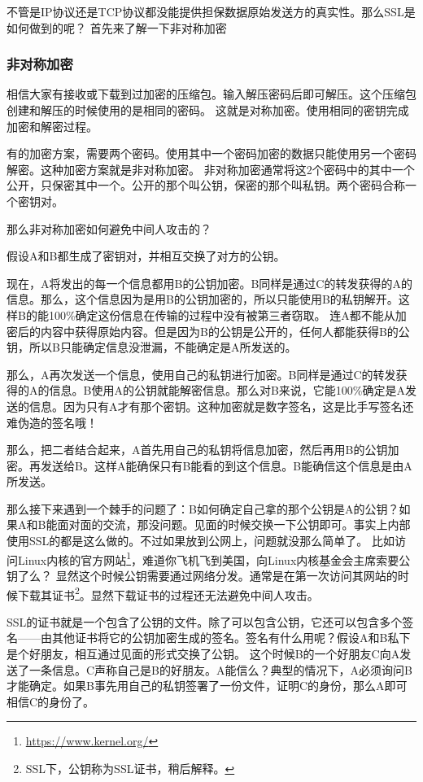 不管是IP协议还是TCP协议都没能提供担保数据原始发送方的真实性。那么SSL是如何做到的呢？
首先来了解一下非对称加密

\begin{insertnote}
\subsubsection*{非对称加密}
相信大家有接收或下载到过加密的压缩包。输入解压密码后即可解压。这个压缩包创建和解压的时候使用的是相同的密码。
这就是对称加密。使用相同的密钥完成加密和解密过程。

有的加密方案，需要两个密码。使用其中一个密码加密的数据只能使用另一个密码解密。这种加密方案就是非对称加密。
非对称加密通常将这2个密码中的其中一个公开，只保密其中一个。公开的那个叫公钥，保密的那个叫私钥。两个密码合称一个密钥对。

\end{insertnote}

那么非对称加密如何避免中间人攻击的？

假设A和B都生成了密钥对，并相互交换了对方的公钥。

现在，A将发出的每一个信息都用B的公钥加密。B同样是通过C的转发获得的A的信息。那么，这个信息因为是用B的公钥加密的，所以只能使用B的私钥解开。这样B的能100\%确定这份信息在传输的过程中没有被第三者窃取。
连A都不能从加密后的内容中获得原始内容。但是因为B的公钥是公开的，任何人都能获得B的公钥，所以B只能确定信息没泄漏，不能确定是A所发送的。

那么，A再次发送一个信息，使用自己的私钥进行加密。B同样是通过C的转发获得的A的信息。B使用A的公钥就能解密信息。那么对B来说，它能100\%确定是A发送的信息。因为只有A才有那个密钥。这种加密就是数字签名，这是比手写签名还难伪造的签名哦！

那么，把二者结合起来，A首先用自己的私钥将信息加密，然后再用B的公钥加密。再发送给B。这样A能确保只有B能看的到这个信息。B能确信这个信息是由A所发送。

那么接下来遇到一个棘手的问题了：B如何确定自己拿的那个公钥是A的公钥？如果A和B能面对面的交流，那没问题。见面的时候交换一下公钥即可。事实上内部使用SSL的都是这么做的。不过如果放到公网上，问题就没那么简单了。
比如访问Linux内核的官方网站\footnote{\url{https://www.kernel.org/} }，难道你飞机飞到美国，向Linux内核基金会主席索要公钥了么？
显然这个时候公钥需要通过网络分发。通常是在第一次访问其网站的时候下载其证书\footnote{SSL下，公钥称为SSL证书，稍后解释。}。显然下载证书的过程还无法避免中间人攻击。%

SSL的证书就是一个包含了公钥的文件。除了可以包含公钥，它还可以包含多个签名——由其他证书将它的公钥加密生成的签名。签名有什么用呢？假设A和B私下是个好朋友，相互通过见面的形式交换了公钥。
这个时候B的一个好朋友C向A发送了一条信息。C声称自己是B的好朋友。A能信么？典型的情况下，A必须询问B才能确定。如果B事先用自己的私钥签署了一份文件，证明C的身份，那么A即可相信C的身份了。

